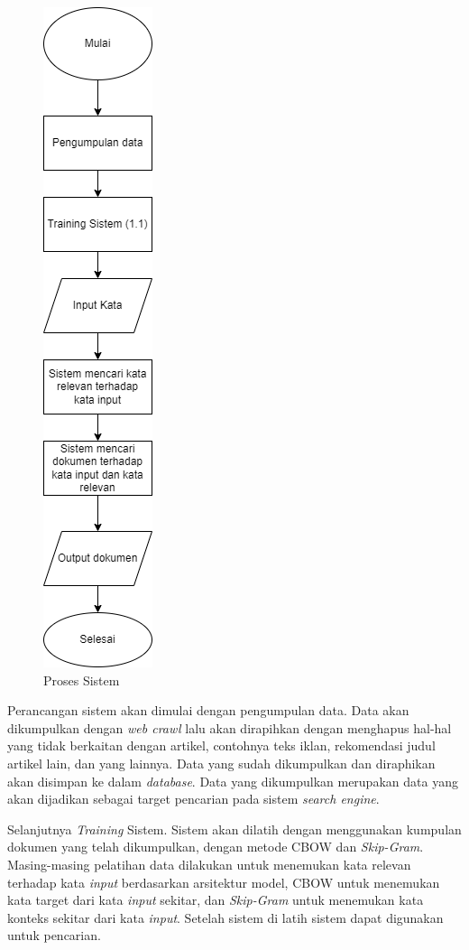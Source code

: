 \documentclass[12pt]{report}
\begin{document}
\begin{figure}[H]
\centering
\includegraphics[scale=0.73]{prosessistemrev3}
\caption{Proses Sistem}
\label{prosessistem}
\end{figure}

Perancangan sistem akan dimulai dengan pengumpulan data. Data akan dikumpulkan dengan \textit{web crawl} lalu akan dirapihkan dengan menghapus hal-hal yang tidak berkaitan dengan artikel, contohnya teks iklan, rekomendasi judul artikel lain, dan yang lainnya. Data yang sudah dikumpulkan dan diraphikan akan disimpan ke dalam \textit{database}. Data yang dikumpulkan merupakan data yang akan dijadikan sebagai target pencarian pada sistem \textit{search engine}.

Selanjutnya \textit{Training} Sistem. Sistem akan dilatih dengan menggunakan kumpulan dokumen yang telah dikumpulkan, dengan metode CBOW dan \textit{Skip-Gram}. Masing-masing pelatihan data dilakukan untuk menemukan kata relevan terhadap kata \textit{input} berdasarkan arsitektur model, CBOW untuk menemukan kata target dari kata \textit{input} sekitar, dan \textit{Skip-Gram} untuk menemukan kata konteks sekitar dari kata \textit{input}. Setelah sistem di latih sistem dapat digunakan untuk pencarian.
\end{document}
